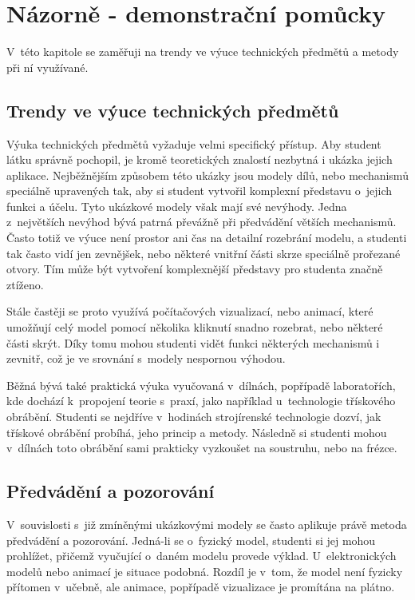 \chapter{Názorně - demonstrační pomůcky}
V~této kapitole se zaměřuji na trendy ve výuce technických předmětů a metody při ní využívané.

\section{Trendy ve výuce technických předmětů}
Výuka technických předmětů vyžaduje velmi specifický přístup.
Aby student látku správně pochopil, je kromě teoretických znalostí nezbytná i ukázka jejich aplikace.
Nejběžnějším způsobem této ukázky jsou modely dílů, nebo mechanismů speciálně upravených tak, aby si student vytvořil komplexní představu o~jejich funkci a účelu.
Tyto ukázkové modely však mají své nevýhody. 
Jedna z~největších nevýhod bývá patrná převážně při předvádění větších mechanismů.
Často totiž ve výuce není prostor ani čas na detailní rozebrání modelu, a studenti tak často vidí jen zevnějšek, nebo některé vnitřní části skrze speciálně prořezané otvory.
Tím může být vytvoření komplexnější představy pro studenta značně ztíženo.

Stále častěji se proto využívá počítačových vizualizací, nebo animací, které umožňují celý model pomocí několika kliknutí snadno rozebrat, nebo některé části skrýt. 
Díky tomu mohou studenti vidět funkci některých mechanismů i zevnitř, což je ve srovnání s~modely nespornou výhodou.

Běžná bývá také praktická výuka vyučovaná v~dílnách, popřípadě laboratořích, kde dochází k~propojení teorie s~praxí, jako například u~technologie třískového obrábění.
Studenti se nejdříve v~hodinách strojírenské technologie dozví, jak třískové obrábění probíhá, jeho princip a metody.
Následně si studenti mohou v~dílnách toto obrábění sami prakticky vyzkoušet na soustruhu, nebo na frézce.

\section{Předvádění a pozorování}
V~souvislosti s~již zmíněnými ukázkovými modely se často aplikuje právě metoda předvádění a pozorování.
Jedná-li se o~fyzický model, studenti si jej mohou prohlížet, přičemž vyučující o~daném modelu provede výklad.
U~elektronických modelů nebo animací je situace podobná.
Rozdíl je v~tom, že model není fyzicky přítomen v~učebně, ale animace, popřípadě vizualizace je promítána na plátno.


